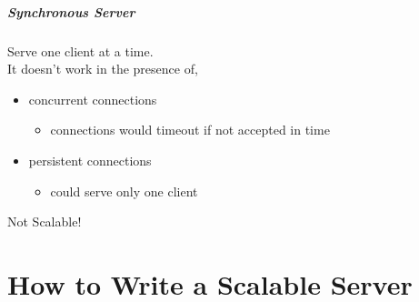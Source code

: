 \documentclass[aspectratio=43]{beamer}
\begin{document}
\begin{frame}
  \frametitle{Synchronous Server}

\hspace*{2em} \begin{minipage}{.8\textwidth}
Serve one client at a time.\\[2em]

It doesn't work in the presence of,
\begin{itemize}
\item concurrent connections
\begin{itemize}\item connections would timeout if not accepted in time\end{itemize}
\item persistent connections
\begin{itemize}\item could serve only one client \end{itemize}
\end{itemize}

\vspace{2em}
\begin{center}
{\LARGE Not Scalable!}
\end{center}
\end{minipage}
\end{frame}
\part{How to Write a Scalable Server}
\end{document}
